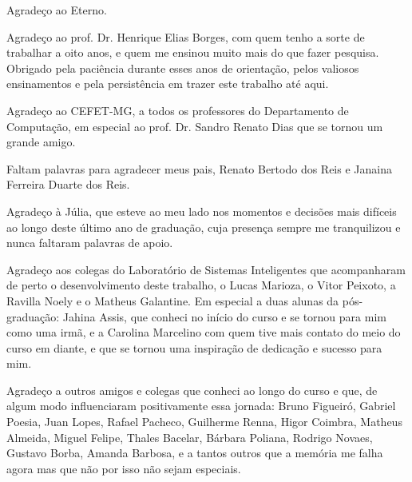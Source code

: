 


\begin{agradecimentos}

Agradeço ao Eterno.

Agradeço ao prof. Dr. Henrique Elias Borges, com quem tenho a sorte de trabalhar a oito anos, e quem me ensinou muito mais do que fazer pesquisa. Obrigado pela paciência durante esses anos de orientação, pelos valiosos ensinamentos e pela persistência em trazer este trabalho até aqui.

Agradeço ao CEFET-MG, a todos os professores do Departamento de Computação, em especial ao prof. Dr. Sandro Renato Dias que se tornou um grande amigo.

Faltam palavras para agradecer meus pais, Renato Bertodo dos Reis e Janaina Ferreira Duarte dos Reis.

Agradeço à Júlia, que esteve ao meu lado nos momentos e decisões mais difíceis ao longo deste último ano de graduação, cuja presença sempre me tranquilizou e nunca faltaram palavras de apoio.

Agradeço aos colegas do Laboratório de Sistemas Inteligentes que acompanharam de perto o desenvolvimento deste trabalho, o Lucas Marioza, o Vitor Peixoto, a Ravilla Noely e o Matheus Galantine. Em especial a duas alunas da pós-graduação: Jahina Assis, que conheci no início do curso e se tornou para mim como uma irmã, e a Carolina Marcelino com quem tive mais contato do meio do curso em diante, e que se tornou uma inspiração de dedicação e sucesso para mim.

Agradeço a outros amigos e colegas que conheci ao longo  do curso e que, de algum modo influenciaram positivamente essa jornada: Bruno Figueiró, Gabriel Poesia, Juan Lopes, Rafael Pacheco, Guilherme Renna, Higor Coimbra, Matheus Almeida, Miguel Felipe, Thales Bacelar, Bárbara Poliana, Rodrigo Novaes, Gustavo Borba, Amanda Barbosa, e a tantos outros que a memória me falha agora mas que não por isso não sejam especiais. 

\end{agradecimentos}
